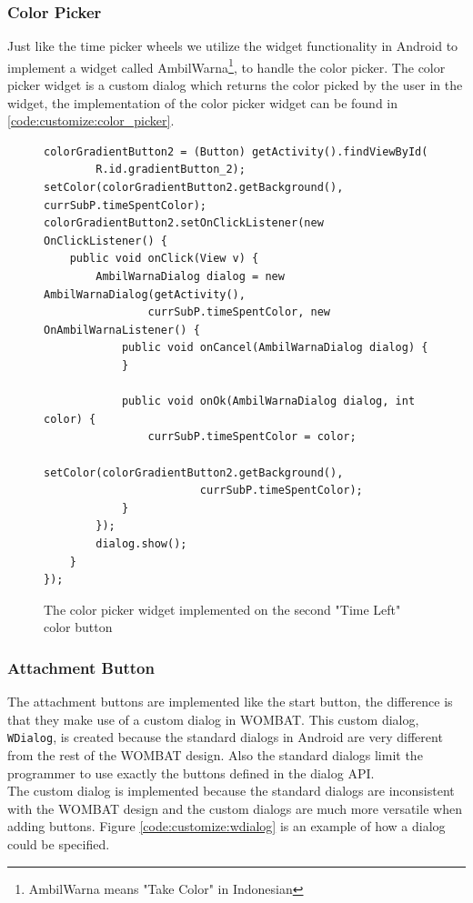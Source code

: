 \subsubsection*{Color Picker}
Just like the time picker wheels we utilize the widget functionality in Android to implement a widget called AmbilWarna\footnote{AmbilWarna means "Take Color" in Indonesian}, to handle the color picker\cite{web:android:customize:color}.
The color picker widget is a custom dialog which returns the color picked by the user in the widget, the implementation of the color picker widget can be found in \autoref{code:customize:color_picker}.
\begin{figure}[H]
\begin{lstlisting}
colorGradientButton2 = (Button) getActivity().findViewById(
		R.id.gradientButton_2);
setColor(colorGradientButton2.getBackground(), currSubP.timeSpentColor);
colorGradientButton2.setOnClickListener(new OnClickListener() {
	public void onClick(View v) {
		AmbilWarnaDialog dialog = new AmbilWarnaDialog(getActivity(),
				currSubP.timeSpentColor, new OnAmbilWarnaListener() {
			public void onCancel(AmbilWarnaDialog dialog) {
			}

			public void onOk(AmbilWarnaDialog dialog, int color) {
				currSubP.timeSpentColor = color;
				setColor(colorGradientButton2.getBackground(),
						currSubP.timeSpentColor);
			}
		});
		dialog.show();
	}
});
\end{lstlisting}
\caption{The color picker widget implemented on the second "Time Left" color button}%
\label{code:customize:color_picker}%
\end{figure}

\subsubsection*{Attachment Button}
\label{subsubsec:attach}
The attachment buttons are implemented like the start button, the difference is that they make use of a custom dialog in WOMBAT.
This custom dialog, \texttt{WDialog}, is created because the standard dialogs in Android are very different from the rest of the WOMBAT design.
Also the standard dialogs limit the programmer to use exactly the buttons defined in the dialog API.\\
The custom dialog is implemented because the standard dialogs are inconsistent with the WOMBAT design and the custom dialogs are much more versatile when adding buttons.
Figure \ref{code:customize:wdialog} is an example of how a dialog could be specified.

